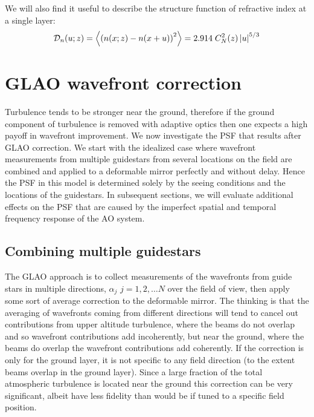 \documentclass[11pt, oneside]{article}   	%
\begin{document}
We will also find it useful to describe the structure function of refractive index at a single layer:
\begin{equation}
\label{eqn:SFindex}
{\cal D}_n(u;z) = \left< \left( n(x;z) - n(x+u) \right)^2 \right> = 2.914\; C_N^2(z) \left|u\right|^{5/3}
\end{equation}

\section{GLAO wavefront correction}

Turbulence tends to be stronger near the ground, therefore if the ground component of turbulence is removed with adaptive optics then one expects a high payoff in wavefront improvement.
We now investigate the PSF that results after GLAO correction. We start with the idealized case where wavefront measurements from multiple guidestars from several locations on the field are combined and applied to a deformable mirror perfectly and without delay. Hence the PSF in this model is determined solely by the seeing conditions and the locations of the guidestars.  In subsequent sections, we will evaluate additional effects on the PSF that are caused by the imperfect spatial and temporal frequency response of the AO system.

\subsection{Combining multiple guidestars}

The GLAO approach is to collect measurements of the wavefronts from guide stars in multiple directions, $\alpha_j$ $j = 1,2,\ldots N$ over the field of view, then apply some sort of average correction to the deformable mirror.  The thinking is that the averaging of wavefronts coming from different directions will tend to cancel out contributions from upper altitude turbulence, where the beams do not overlap and so wavefront contributions add incoherently, but near the ground, where the beams do overlap the wavefront contributions add coherently. If the correction is only for the ground layer, it is not specific to any field direction (to the extent beams overlap in the ground layer).  Since a large fraction of the total atmospheric turbulence is located near the ground this correction can be very significant, albeit have less fidelity than would be if tuned to a specific field position.
\end{document}
